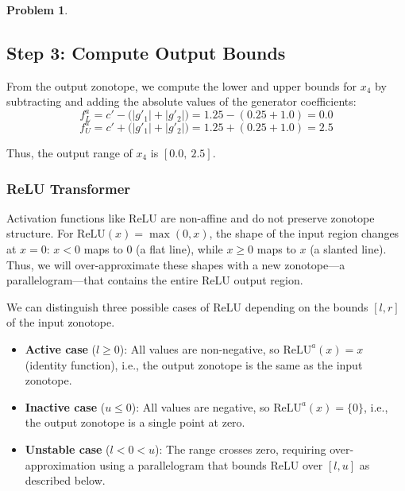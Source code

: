 \documentclass[oneside,11pt,dvipsnames]{book}
\numberwithin{equation}{section}
\theoremstyle{definition}
\newtheorem{problem}{Problem}[section]
\theoremstyle{remark}
\newenvironment{solution}{%
  \ifbool{showsol}{%
    \begin{mysolbox}%
        {\small \textbf{Solution}: }
  }{%
    \comment %
  }%
}{%
  \ifbool{showsol}{%
    \end{mysolbox}%
  }{%
    \endcomment %
  }%
}
\begin{document}
\begin{problem}
\begin{solution}
\subsection*{Step 3: Compute Output Bounds}

From the output zonotope, we compute the lower and upper bounds for $x_4$ by
subtracting and adding the absolute values of the generator coefficients:
\[
f^a_L = c' - \bigl(|g'_1| + |g'_2|\bigr) = 1.25 - (0.25 + 1.0) = 0.0
\]
\[
f^a_U = c' + \bigl(|g'_1| + |g'_2|\bigr) = 1.25 + (0.25 + 1.0) = 2.5
\]

Thus, the output range of $x_4$ is $[0.0,\ 2.5]$.
\end{solution}
\end{problem}


\subsubsection{ReLU Transformer}

Activation functions like ReLU are non-affine and do not preserve zonotope structure.
For \(\text{ReLU}(x) = \max(0, x)\), the shape of the input region changes at \(x = 0\): $x < 0$ maps to $0$ (a flat line), while $x \ge 0$ maps to $x$ (a slanted line). Thus, we will over-approximate these shapes with a new zonotope---a parallelogram---that contains the entire ReLU output region.

We can distinguish three possible cases of ReLU depending on the bounds $[l,r]$ of the input zonotope.

\begin{itemize}
    \item \textbf{Active case} (\(l \geq 0\)):
    All values are non-negative, so \(\text{ReLU}^a(x) = x\) (identity function), i.e., the output zonotope is the same as the input zonotope.


    \item \textbf{Inactive case} (\(u \leq 0\)):
    All values are negative, so \(\text{ReLU}^a(x) = \{0\}\), i.e., the output zonotope is a single point at zero.


    \item \textbf{Unstable case} (\(l < 0 < u\)):
    The range crosses zero, requiring over-approximation using a parallelogram that bounds ReLU over \([l, u]\) as described below.
\end{itemize}
\end{document}
